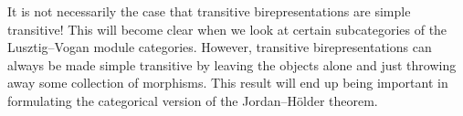 \noindent It is not necessarily the case that transitive birepresentations are simple transitive! This will become clear when we look at certain subcategories of the Lusztig--Vogan module categories. However, transitive birepresentations can always be made simple transitive by leaving the objects alone and just throwing away some collection of morphisms. This result will end up being important in formulating the categorical version of the Jordan--H\"{o}lder theorem.\\ %





